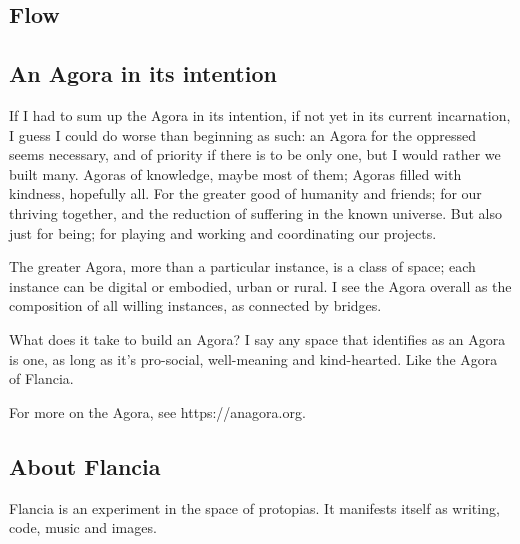 \fleuronb

\subsection*{Flow}

\fleurona


\subsection*{An Agora in its intention}

If I had to sum up the Agora in its intention, if not yet in its current incarnation, I guess I could do worse than beginning as such: an Agora for the oppressed seems necessary, and of priority if there is to be only one, but I would rather we built many. Agoras of knowledge, maybe most of them; Agoras filled with kindness, hopefully all. For the greater good of humanity and friends; for our thriving together, and the reduction of suffering in the known universe. But also just for being; for playing and working and coordinating our projects.

The greater Agora, more than a particular instance, is a class of space; each instance can be digital or embodied, urban or rural. I see the Agora overall as the composition of all willing instances, as connected by bridges.

What does it take to build an Agora? I say any space that identifies as an Agora is one, as long as it's pro-social, well-meaning and kind-hearted. Like the Agora of Flancia.

For more on the Agora, see https://anagora.org.

\subsection*{About Flancia}

Flancia is an experiment in the space of protopias. It manifests itself as writing, code, music and images.

